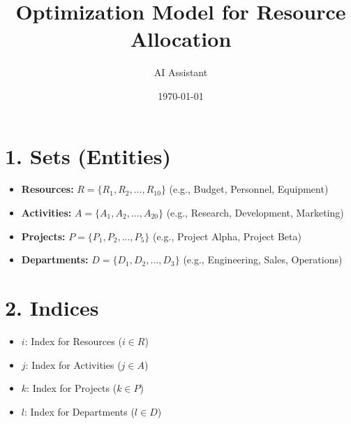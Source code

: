 \documentclass{article}
\title{Optimization Model for Resource Allocation}
\author{AI Assistant}
\date{\today}
\begin{document}
\maketitle
\tableofcontents
\newpage

\section{1. Sets (Entities)}
\begin{itemize}
    \item \textbf{Resources:} $R = \{R_1, R_2, ..., R_{10}\}$ (e.g., Budget, Personnel, Equipment)
    \item \textbf{Activities:} $A = \{A_1, A_2, ..., A_{20}\}$ (e.g., Research, Development, Marketing)
    \item \textbf{Projects:} $P = \{P_1, P_2, ..., P_{5}\}$ (e.g., Project Alpha, Project Beta)
    \item \textbf{Departments:} $D = \{D_1, D_2, ..., D_{3}\}$ (e.g., Engineering, Sales, Operations)
\end{itemize}

\section{2. Indices}
\begin{itemize}
    \item $i$: Index for Resources ($i \in R$)
    \item $j$: Index for Activities ($j \in A$)
    \item $k$: Index for Projects ($k \in P$)
    \item $l$: Index for Departments ($l \in D$)
\end{itemize}
\end{document}
